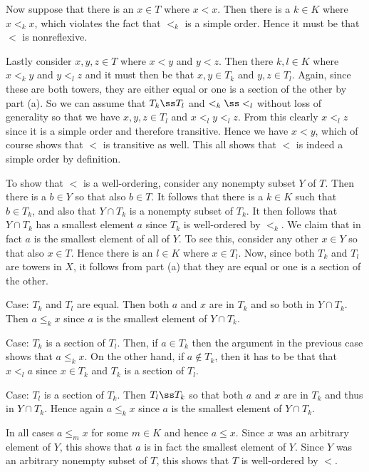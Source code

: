 {{    Now suppose that there is an $x \in T$ where $x < x$.
    Then there is a $k \in K$ where $x <_k x$, which violates the fact that $<_k$ is a simple order.
    Hence it must be that $<$ is nonreflexive.

    Lastly consider $x,y,z \in T$ where $x < y$ and $y < z$.
    Then there $k,l \in K$ where $x <_k y$ and $y <_l z$ and it must then be that $x,y \in T_k$ and $y,z \in T_l$.
    Again, since these are both towers, they are either equal or one is a section of the other by part (a).
    So we can assume that $T_k \ss T_l$ and $<_k \ss <_l$ without loss of generality so that we have $x,y,z \in T_l$ and $x <_l y <_l z$.
    From this clearly $x <_l z$ since it is a simple order and therefore transitive.
    Hence we have $x < y$, which of course shows that $<$ is transitive as well.
    This all shows that $<$ is indeed a simple order by definition.

    To show that $<$ is a well-ordering, consider any nonempty subset $Y$ of $T$.
    Then there is a $b \in Y$ so that also $b \in T$.
    It follows that there is a $k \in K$ such that $b \in T_k$, and also that $Y \cap T_k$ is a nonempty subset of $T_k$.
    It then follows that $Y \cap T_k$ has a smallest element $a$ since $T_k$ is well-ordered by $<_k$.
    We claim that in fact $a$ is the smallest element of all of $Y$.
    To see this, consider any other $x \in Y$ so that also $x \in T$.
    Hence there is an $l \in K$ where $x \in T_l$.
    Now, since both $T_k$ and $T_l$ are towers in $X$, it follows from part (a) that they are equal or one is a section of the other.

    Case: $T_k$ and $T_l$ are equal.
    Then both $a$ and $x$ are in $T_k$ and so both in $Y \cap T_k$.
    Then $a \leq_k x$ since $a$ is the smallest element of $Y \cap T_k$.

    Case: $T_k$ is a section of $T_l$.
    Then, if $a \in T_k$ then the argument in the previous case shows that $a \leq_k x$.
    On the other hand, if $a \notin T_k$, then it has to be that that $x <_l a$ since $x \in T_k$ and $T_k$ is a section of $T_l$.

    Case: $T_l$ is a section of $T_k$.
    Then $T_l \ss T_k$ so that both $a$ and $x$ are in $T_k$ and thus in $Y \cap T_k$.
    Hence again $a \leq_k x$ since $a$ is the smallest element of $Y \cap T_k$.

    In all cases $a \leq_m x$ for some $m \in K$ and hence $a \leq x$.
    Since $x$ was an arbitrary element of $Y$, this shows that $a$ is in fact the smallest element of $Y$.
    Since $Y$ was an arbitrary nonempty subset of $T$, this shows that $T$ is well-ordered by $<$.

}}
